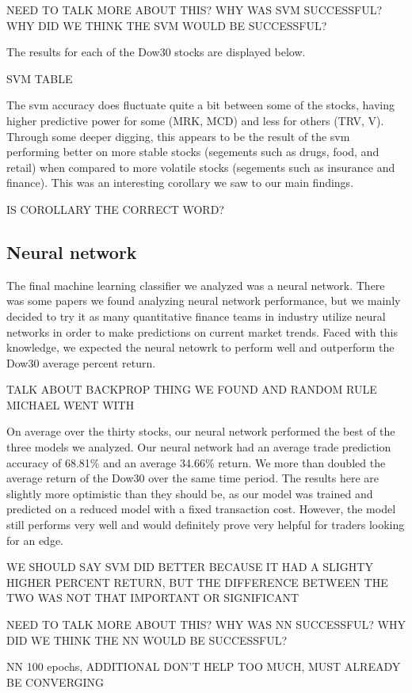 \documentclass{article}
\begin{document}
NEED TO TALK MORE ABOUT THIS? WHY WAS SVM SUCCESSFUL? WHY DID WE THINK THE SVM WOULD BE SUCCESSFUL?

The results for each of the Dow30 stocks are displayed below.

SVM TABLE

The svm accuracy does fluctuate quite a bit between some of the stocks, having higher predictive power for some (MRK, MCD) and less for others (TRV, V). Through some deeper digging, this appears to be the result of the svm performing better on more stable stocks (segements such as drugs, food, and retail) when compared to more volatile stocks (segements such as insurance and finance). This was an interesting corollary we saw to our main findings.

IS COROLLARY THE CORRECT WORD?

\subsection{Neural network}
The final machine learning classifier we analyzed was a neural network. There was some papers we found analyzing neural network performance, but we mainly decided to try it as many quantitative finance teams in industry utilize neural networks in order to make predictions on current market trends. Faced with this knowledge, we expected the neural netowrk to perform well and outperform the Dow30 average percent return.

TALK ABOUT BACKPROP THING WE FOUND AND RANDOM RULE MICHAEL WENT WITH

On average over the thirty stocks, our neural network performed the best of the three models we analyzed. Our neural network had an average trade prediction accuracy of 68.81\% and an average 34.66\% return. We more than doubled the average return of the Dow30 over the same time period. The results here are slightly more optimistic than they should be, as our model was trained and predicted on a reduced model with a fixed transaction cost. However, the model still performs very well and would definitely prove very helpful for traders looking for an edge.

WE SHOULD SAY SVM DID BETTER BECAUSE IT HAD A SLIGHTY HIGHER PERCENT RETURN, BUT THE DIFFERENCE BETWEEN THE TWO WAS NOT THAT IMPORTANT OR SIGNIFICANT

NEED TO TALK MORE ABOUT THIS? WHY WAS NN SUCCESSFUL? WHY DID WE THINK THE NN WOULD BE SUCCESSFUL?

NN 100 epochs, ADDITIONAL DON'T HELP TOO MUCH, MUST ALREADY BE CONVERGING
\end{document}
